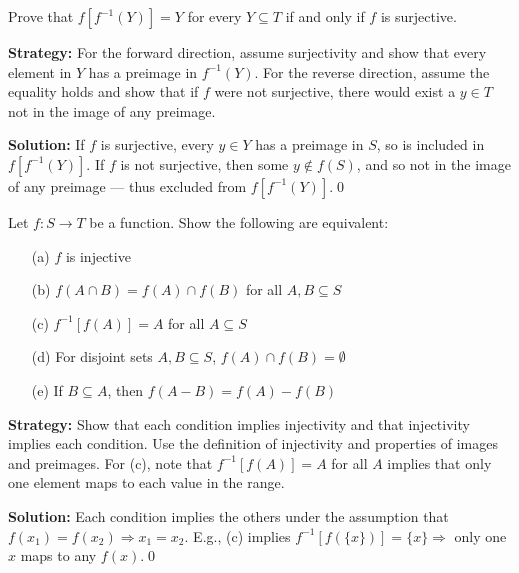 \begin{problembox}
Prove that \( f[f^{-1}(Y)] = Y \) for every \( Y \subseteq T \) if and only if \( f \) is surjective.
\end{problembox}

\noindent\textbf{Strategy:} For the forward direction, assume surjectivity and show that every element in $Y$ has a preimage in $f^{-1}(Y)$. For the reverse direction, assume the equality holds and show that if $f$ were not surjective, there would exist a $y \in T$ not in the image of any preimage.

\noindent\bigskip\noindent\textbf{Solution:}  
If \( f \) is surjective, every \( y \in Y \) has a preimage in \( S \), so is included in \( f[f^{-1}(Y)] \).  
If \( f \) is not surjective, then some \( y \notin f(S) \), and so not in the image of any preimage — thus excluded from \( f[f^{-1}(Y)] \).\qed



\begin{problembox}
Let \( f: S \to T \) be a function. Show the following are equivalent:
\begin{itemize}
\item[(a)] \( f \) is injective
\item[(b)] \( f(A \cap B) = f(A) \cap f(B) \) for all \( A, B \subseteq S \)
\item[(c)] \( f^{-1}[f(A)] = A \) for all \( A \subseteq S \)
\item[(d)] For disjoint sets \( A, B \subseteq S \), \( f(A) \cap f(B) = \emptyset \)
\item[(e)] If \( B \subseteq A \), then \( f(A - B) = f(A) - f(B) \)
\end{itemize}
\end{problembox}

\noindent\textbf{Strategy:} Show that each condition implies injectivity and that injectivity implies each condition. Use the definition of injectivity and properties of images and preimages. For (c), note that $f^{-1}[f(A)] = A$ for all $A$ implies that only one element maps to each value in the range.

\noindent\bigskip\noindent\textbf{Solution:}  
Each condition implies the others under the assumption that \( f(x_1) = f(x_2) \Rightarrow x_1 = x_2 \).  
E.g., (c) implies \( f^{-1}[f(\{x\})] = \{x\} \Rightarrow \) only one \( x \) maps to any \( f(x) \).\qed



